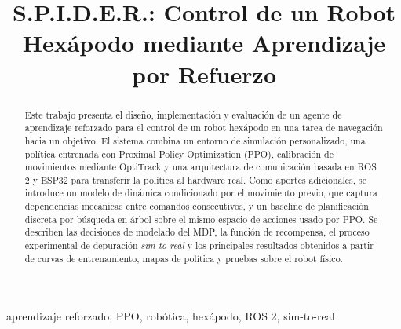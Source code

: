 \documentclass[conference]{IEEEtran}
\begin{document}
\title{S.P.I.D.E.R.: Control de un Robot Hexápodo mediante Aprendizaje por Refuerzo}

\author{
}

\maketitle

\begin{abstract}
Este trabajo presenta el diseño, implementación y evaluación de un agente de aprendizaje reforzado para el control de un robot hexápodo en una tarea de navegación hacia un objetivo. El sistema combina un entorno de simulación personalizado, una política entrenada con Proximal Policy Optimization (PPO), calibración de movimientos mediante OptiTrack y una arquitectura de comunicación basada en ROS 2 y ESP32 para transferir la política al hardware real. Como aportes adicionales, se introduce un modelo de dinámica condicionado por el movimiento previo, que captura dependencias mecánicas entre comandos consecutivos, y un baseline de planificación discreta por búsqueda en árbol sobre el mismo espacio de acciones usado por PPO. Se describen las decisiones de modelado del MDP, la función de recompensa, el proceso experimental de depuración \textit{sim-to-real} y los principales resultados obtenidos a partir de curvas de entrenamiento, mapas de política y pruebas sobre el robot físico.
\end{abstract}

\begin{IEEEkeywords}
aprendizaje reforzado, PPO, robótica, hexápodo, ROS 2, sim-to-real
\end{IEEEkeywords}

\IEEEpeerreviewmaketitle
\end{document}
